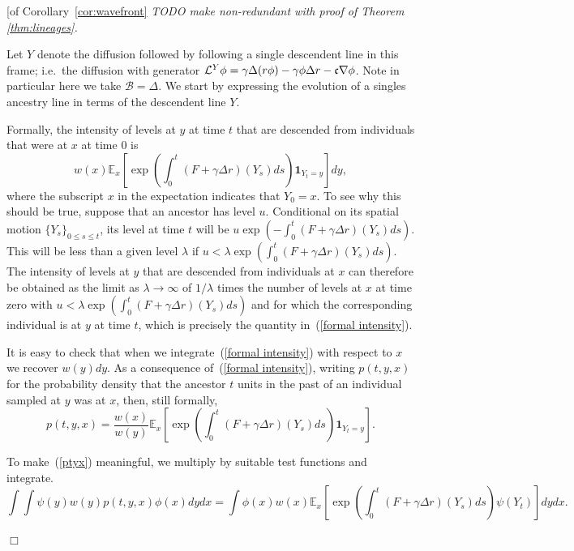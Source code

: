 \documentclass[12pt]{article}
\newenvironment {proof}{{\noindent\bf Proof }}{\hfill $\Box$ \medskip}
\newcommand{\IE}{\mathbb E}
\newcommand{\ind}{\mathbf{1}}
\newcommand{\comment}[1]{{\color{blue} \it #1}}
\begin{document}
\begin{proof}[of Corollary~\ref{cor:wavefront}
    \comment{
        TODO make non-redundant with proof of Theorem \ref{thm:lineages}.
    }

Let $Y$ denote the diffusion followed by following a single descendent line in this frame; 
i.e.~the diffusion with generator ${\cal L}^Y\phi=\gamma\Delta(r\phi)-\gamma\phi\Delta r -\mathfrak{c}\nabla\phi $. Note in particular here we take $\mathcal{B}=\Delta$. We start by expressing the evolution of a singles ancestry line in terms of the descendent line $Y$.

Formally, the intensity of levels at $y$ at time $t$ that are descended from 
individuals that were at $x$ at time $0$ is
\begin{equation}
\label{formal intensity}
w(x)\IE_x\left[\exp\left(\int_0^t (F+\gamma \Delta r)(Y_s)ds\right)\ind_{Y_t=y}\right]dy,
\end{equation}
where the subscript $x$ in the expectation indicates that $Y_0=x$.
To see why this should be true, 
suppose that an ancestor has level $u$. Conditional on its 
spatial motion $\{Y_s\}_{0\leq s\leq t}$, its level at time $t$ will
be $u\exp(-\int_0^t(F+\gamma\Delta r)(Y_s)ds)$. This will be less than a given level 
$\lambda$ if $u<\lambda \exp(\int_0^t(F+\gamma\Delta r)(Y_s)ds)$. 
The intensity of levels at $y$ that are descended from individuals at
$x$ can therefore be obtained as the limit as $\lambda\to\infty$ of 
$1/\lambda$ times the number of levels at $x$ at time zero with
$u<\lambda \exp(\int_0^t(F+\gamma\Delta r)(Y_s)ds)$ and for which
the corresponding individual is at $y$ at time $t$, which is 
precisely the quantity in~(\ref{formal intensity}). 

It is easy to check that when we integrate~(\ref{formal intensity})
with respect to $x$ we recover $w(y)dy$. 
As a consequence of~(\ref{formal intensity}), writing $p(t,y,x)$ for
the probability density that the ancestor $t$ units in 
the past of an individual sampled 
at $y$ was at $x$, then, still formally,
\begin{equation}
\label{ptyx}
p(t,y,x)=\frac{w(x)}{w(y)}\IE_x\left[\exp\left(\int_0^t (F+\gamma\Delta r)(Y_s)ds\right)
\ind_{Y_t=y}\right].
\end{equation}

To make~(\ref{ptyx}) meaningful, we multiply by suitable test functions and 
integrate.
$$\int\int \psi(y)w(y)p(t,y,x)\phi(x)dydx=\int\phi(x)w(x)
\IE_x\left[\exp\left(\int_0^t(F+\gamma\Delta r)(Y_s)ds\right)\psi(Y_t)\right]dydx.$$


\end{proof}
\end{document}
